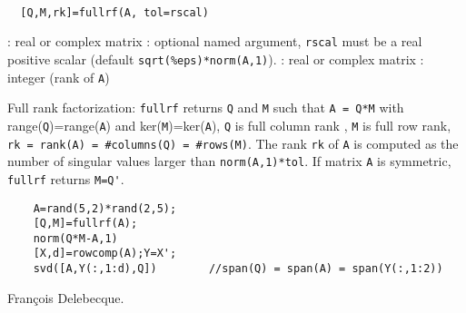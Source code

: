 
\begin{mandesc}
   \\ %
\end{mandesc}
\begin{calling_sequence}
\begin{verbatim}
  [Q,M,rk]=fullrf(A, tol=rscal)  
\end{verbatim}
\end{calling_sequence}
\begin{parameters}
  \begin{varlist}
    : real or complex matrix
    : optional named argument, \verb+rscal+ must be  a real positive scalar (default \verb+sqrt(%eps)*norm(A,1)+).
    : real or complex matrix
    : integer (rank of \verb!A!)
  \end{varlist}
\end{parameters}
\begin{mandescription}
  Full rank factorization: \verb!fullrf! returns \verb!Q! and \verb!M! such
  that \verb!A = Q*M!
  with range(\verb!Q!)=range(\verb!A!) and ker(\verb!M!)=ker(\verb!A!),
  \verb!Q! is full column rank , \verb!M! is full row rank,
  \verb!rk = rank(A) = #columns(Q) = #rows(M)!. The rank \verb!rk! of \verb!A! is 
  computed as the number of singular values larger than \verb!norm(A,1)*tol!.
  If matrix \verb!A! is symmetric, \verb!fullrf! returns \verb!M=Q'!.
\end{mandescription}
\begin{examples}
  \begin{Verbatim}
    A=rand(5,2)*rand(2,5);
    [Q,M]=fullrf(A);
    norm(Q*M-A,1)
    [X,d]=rowcomp(A);Y=X';
    svd([A,Y(:,1:d),Q])        //span(Q) = span(A) = span(Y(:,1:2))
  \end{Verbatim}
\end{examples}
\begin{manseealso}
        
\end{manseealso}
\begin{authors}
  Fran\c{c}ois Delebecque.
\end{authors}
